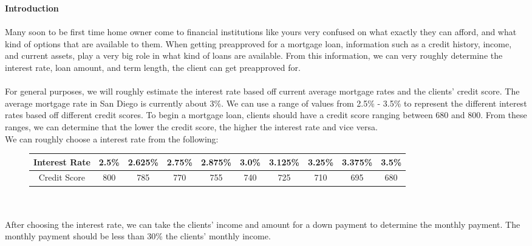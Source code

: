\documentclass[12pt]{article}
\newenvironment{Section}[1]{}{\newpage}
\begin{document}
	\begin{Section}{Introduction}
		\textbf{\Huge Introduction}
		\\ \\
		Many soon to be first time home owner come to financial institutions like yours very confused on what exactly they can afford, and what kind of options that are available to them.  When getting preapproved for a mortgage loan, information such as a credit history, income, and current assets, play a very big role in what kind of loans are available.  From this information, we can very roughly determine the interest rate, loan amount, and term length, the client can get preapproved for.  
		\\ \\
		For general purposes, we will roughly estimate the interest rate based off current average mortgage rates and the clients' credit score.  The average mortgage rate in San Diego is currently about 3\%.  We can use a range of values from 2.5\% - 3.5\% to represent the different interest rates based off different credit scores.  To begin a mortgage loan, clients should have a credit score ranging between 680 and 800.  From these ranges, we can determine that the lower the credit score, the higher the interest rate and vice versa.
		\\ 
		We can roughly choose a interest rate from the following:
		\begin{figure}[h!]
			\centering
			\begin{tabular}{|c|c|c|c|c|c|c|c|c|c|}
				\hline
				Interest Rate & 2.5\% & 2.625\% & 2.75\% & 2.875\% & 3.0\% & 3.125\% & 3.25\% & 3.375\% & 3.5\% \\
				\hline
				Credit Score & 800 & 785 & 770 & 755 & 740 & 725 & 710 & 695 & 680  \\
				\hline
			\end{tabular}
		\end{figure}
		\\ \\
		After choosing the interest rate, we can take the clients' income and amount for a down payment to determine the monthly payment.  The monthly payment should be less than 30\%  the clients' monthly income.  
	\end{Section}
\end{document}
